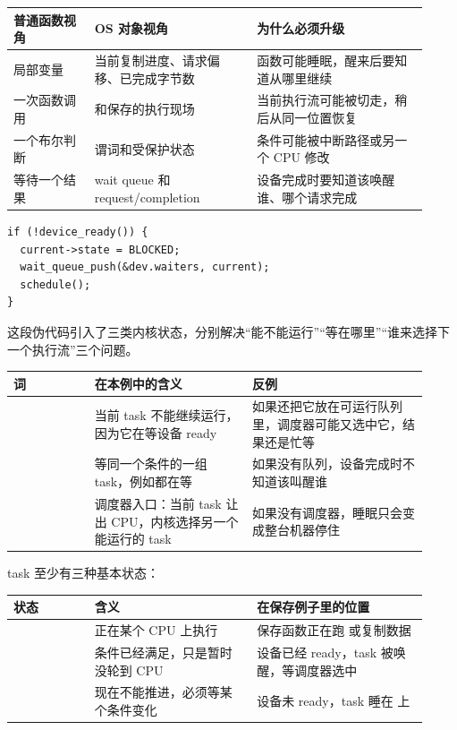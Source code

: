 \begin{longtable}{|L{0.18\linewidth}|L{0.36\linewidth}|L{0.38\linewidth}|}
\toprule
普通函数视角 & OS 对象视角 & 为什么必须升级 \\
\midrule
局部变量  & 当前复制进度、请求偏移、已完成字节数 & 函数可能睡眠，醒来后要知道从哪里继续 \\\tablerowrule
一次函数调用 &  和保存的执行现场 & 当前执行流可能被切走，稍后从同一位置恢复 \\\tablerowrule
一个布尔判断 & 谓词和受保护状态 & 条件可能被中断路径或另一个 CPU 修改 \\\tablerowrule
等待一个结果 & wait queue 和 request/completion & 设备完成时要知道该唤醒谁、哪个请求完成 \\
\bottomrule
\end{longtable}

\begin{lstlisting}
if (!device_ready()) {
  current->state = BLOCKED;
  wait_queue_push(&dev.waiters, current);
  schedule();
}
\end{lstlisting}

这段伪代码引入了三类内核状态，分别解决“能不能运行”“等在哪里”“谁来选择下一个执行流”三个问题。

\begin{longtable}{|L{0.18\linewidth}|L{0.35\linewidth}|L{0.39\linewidth}|}
\toprule
词 & 在本例中的含义 & 反例 \\
\midrule
{} & 当前 task 不能继续运行，因为它在等设备 ready & 如果还把它放在可运行队列里，调度器可能又选中它，结果还是忙等 \\\tablerowrule
{} & 等同一个条件的一组 task，例如都在等  & 如果没有队列，设备完成时不知道该叫醒谁 \\\tablerowrule
{} & 调度器入口：当前 task 让出 CPU，内核选择另一个能运行的 task & 如果没有调度器，睡眠只会变成整台机器停住 \\
\bottomrule
\end{longtable}

task 至少有三种基本状态：

\begin{longtable}{|L{0.18\linewidth}|L{0.36\linewidth}|L{0.38\linewidth}|}
\toprule
状态 & 含义 & 在保存例子里的位置 \\
\midrule
{} & 正在某个 CPU 上执行 & 保存函数正在跑  或复制数据 \\\tablerowrule
{} & 条件已经满足，只是暂时没轮到 CPU & 设备已经 ready，task 被唤醒，等调度器选中 \\\tablerowrule
{} & 现在不能推进，必须等某个条件变化 & 设备未 ready，task 睡在  上 \\
\bottomrule
\end{longtable}

